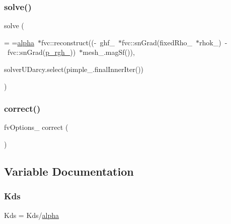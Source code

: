 \mbox{\label{UEqn__1pl_8H_a07e4add2a2b8e3ede321e044739a731e}} 
\subsubsection{\texorpdfstring{solve()}{solve()}}
{\footnotesize\ttfamily solve (\begin{DoxyParamCaption}\item[{\hyperlink{UEqn__1pl_8H_afd1b8693a3c3032de396035e7045d467}{U\+Eqn}}]{ = {\ttfamily =\hyperlink{UEqn__1pl_8H_a7fe02434a19f3e00e927f32adcbb193b}{alpha}~$\ast$fvc\+:\+:reconstruct((-\/~ghf\+\_\+~$\ast$fvc\+:\+:snGrad(fixedRho\+\_\+~$\ast$rhok\+\_\+)~-\/~fvc\+:\+:snGrad(\hyperlink{updatePP__rghRho__2p_8H_a320090d1a3c1675778a59e981765c77c}{p\+\_\+rgh\+\_\+}))~$\ast$mesh\+\_\+.magSf())},  }\item[{mesh\+\_\+.}]{solverU\+Darcy.\+select(pimple\+\_\+.\+final\+Inner\+Iter()) }\end{DoxyParamCaption})}

\mbox{\label{UEqn__1pl_8H_afa0df6b40b0ce36874c336f10f03a407}} 
\subsubsection{\texorpdfstring{correct()}{correct()}}
{\footnotesize\ttfamily fv\+Options\+\_\+ correct (\begin{DoxyParamCaption}\item[{\hyperlink{UEqn__1pl_8H_a128902f421bd168fd4996f177e0a59ad}{U\+Darcy}}]{ }\end{DoxyParamCaption})}



\subsection{Variable Documentation}
\mbox{\label{UEqn__1pl_8H_a1de2ec75382b1cf038f07c3bb9d58957}} 
\subsubsection{\texorpdfstring{Kds}{Kds}}
{\footnotesize\ttfamily Kds = Kds/\hyperlink{UEqn__1pl_8H_a7fe02434a19f3e00e927f32adcbb193b}{alpha}}



